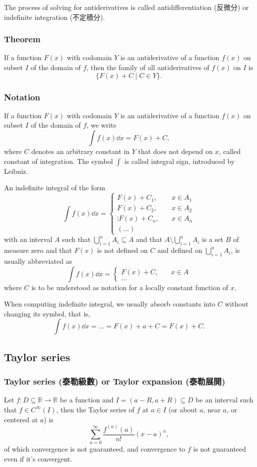 The process of solving for antiderivatives is called antidifferentiation (反微分) or indefinite integration (不定積分).
\subsubsection{Theorem}
If a function $F(x)$ with codomain $Y$ is an antiderivative of a function $f(x)$ on subset $I$ of the domain of $f$, then the family of all antiderivatives of $f(x)$ on $I$ is
\[\{F(x)+C\mid C\in Y\}.\]
\subsubsection{Notation}
If a function $F(x)$ with codomain $Y$ is an antiderivative of a function $f(x)$ on subset $I$ of the domain of $f$, we write
\[\int f(x)\dd{x}=F(x)+C,\]
where $C$ denotes an arbitrary constant in $Y$ that does not depend on $x$, called constant of integration. The symbol $\int$ is called integral sign, introduced by Leibniz.

An indefinite integral of the form
\[\int f(x)\dd{x}=
\begin{cases}
F(x)+C_1,\quad & x\in A_1\\
F(x)+C_2,\quad & x\in A_2\\
\vdots
F(x)+C_n,\quad & x\in A_n\\
(\ldots)
\end{cases}\]
with an interval $A$ such that $\bigcup_{i=1}^nA_i\subseteq A$ and that $A\setminus\bigcup_{i=1}^nA_i$ is a set $B$ of measure zero and that $F(x)$ is not defined on $C$ and defined on $\bigcup_{i=1}^nA_i$, is usually abbreviated as
\[\int f(x)\dd{x}=
\begin{cases}
F(x)+C,\quad & x\in A\\
\ldots
\end{cases}\]
where $C$ is to be understood as notation for a locally constant function of $x$.

When computing indefinite integral, we usually absorb constants into $C$ without changing its symbol, that is,
\[\int f(x)\dd{x}=\ldots=F(x)+a+C=F(x)+C.\]
\subsection{Taylor series}
\subsubsection{Taylor series (泰勒級數) or Taylor expansion (泰勒展開)}
Let $f\colon D\subseteq\mathbb{R}\to\mathbb{R}$ be a function and $I=(a-R,a+R)\subseteq D$ be an interval such that $f\in C^{\infty}(I)$, then the Taylor series of $f$ at $a\in I$ (or about $a$, near $a$, or centered at $a$) is
\[\sum_{n=0}^{\infty}\frac{f^{(n)}(a)}{n!}(x-a)^n,\]
of which convergence is not guaranteed, and convergence to $f$ is not guaranteed even if it's convergent.

